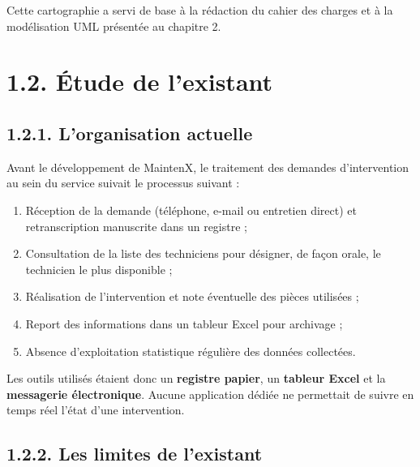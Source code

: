 \documentclass[11pt,a4paper]{report}
\begin{document}
Cette cartographie a servi de base à la rédaction du cahier des charges et à la modélisation UML présentée au chapitre 2.
\section*{1.2. Étude de l'existant}
\subsection*{1.2.1. L'organisation actuelle}

Avant le développement de MaintenX, le traitement des demandes d'intervention au sein du service suivait le processus suivant :
\begin{enumerate}
  \item Réception de la demande (téléphone, e-mail ou entretien direct) et retranscription manuscrite dans un registre ;
  \item Consultation de la liste des techniciens pour désigner, de façon orale, le technicien le plus disponible ;
  \item Réalisation de l'intervention et note éventuelle des pièces utilisées ;
  \item Report des informations dans un tableur Excel pour archivage ;
  \item Absence d'exploitation statistique régulière des données collectées.
\end{enumerate}

Les outils utilisés étaient donc un \textbf{registre papier}, un \textbf{tableur Excel} et la \textbf{messagerie électronique}. Aucune application dédiée ne permettait de suivre en temps réel l'état d'une intervention.
\subsection*{1.2.2. Les limites de l'existant}
\end{document}
